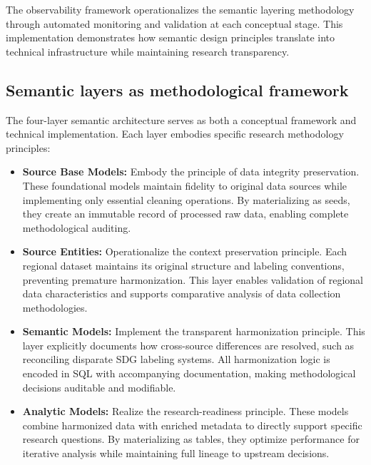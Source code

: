 \documentclass{article}
\begin{document}
The observability framework operationalizes the semantic layering methodology through automated monitoring and validation at each conceptual stage. This implementation demonstrates how semantic design principles translate into technical infrastructure while maintaining research transparency.

\subsection{Semantic layers as methodological framework}
\label{subsec:semantic-layers}

The four-layer semantic architecture serves as both a conceptual framework and technical implementation. Each layer embodies specific research methodology principles:

\begin{itemize}
    \item \textbf{Source Base Models:} Embody the principle of data integrity preservation. These foundational models maintain fidelity to original data sources while implementing only essential cleaning operations. By materializing as seeds, they create an immutable record of processed raw data, enabling complete methodological auditing.

    \item \textbf{Source Entities:} Operationalize the context preservation principle. Each regional dataset maintains its original structure and labeling conventions, preventing premature harmonization. This layer enables validation of regional data characteristics and supports comparative analysis of data collection methodologies.
    
    \item \textbf{Semantic Models:} Implement the transparent harmonization principle. This layer explicitly documents how cross-source differences are resolved, such as reconciling disparate SDG labeling systems. All harmonization logic is encoded in SQL with accompanying documentation, making methodological decisions auditable and modifiable.
    
    \item \textbf{Analytic Models:} Realize the research-readiness principle. These models combine harmonized data with enriched metadata to directly support specific research questions. By materializing as tables, they optimize performance for iterative analysis while maintaining full lineage to upstream decisions.
\end{itemize}
\end{document}
